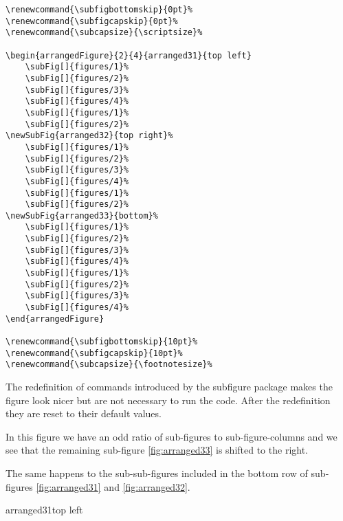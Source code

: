 \documentclass[12pt,a4paper]{article}
\begin{document}
\begin{verbatim}
\renewcommand{\subfigbottomskip}{0pt}%
\renewcommand{\subfigcapskip}{0pt}%
\renewcommand{\subcapsize}{\scriptsize}%

\begin{arrangedFigure}{2}{4}{arranged31}{top left}
    \subFig[]{figures/1}%
    \subFig[]{figures/2}%
    \subFig[]{figures/3}%
    \subFig[]{figures/4}%
    \subFig[]{figures/1}%
    \subFig[]{figures/2}%
\newSubFig{arranged32}{top right}%
    \subFig[]{figures/1}%
    \subFig[]{figures/2}%
    \subFig[]{figures/3}%
    \subFig[]{figures/4}%
    \subFig[]{figures/1}%
    \subFig[]{figures/2}%
\newSubFig{arranged33}{bottom}%
    \subFig[]{figures/1}%
    \subFig[]{figures/2}%
    \subFig[]{figures/3}%
    \subFig[]{figures/4}%
    \subFig[]{figures/1}%
    \subFig[]{figures/2}%
    \subFig[]{figures/3}%
    \subFig[]{figures/4}%
\end{arrangedFigure}

\renewcommand{\subfigbottomskip}{10pt}%
\renewcommand{\subfigcapskip}{10pt}%
\renewcommand{\subcapsize}{\footnotesize}%
\end{verbatim}

The redefinition of commands introduced by the subfigure package makes the figure 
look nicer but are not necessary to run the code. After the redefinition they are reset to 
their default values.

In this figure we have an odd ratio of sub-figures to sub-figure-columns
and we see that the remaining sub-figure \ref{fig:arranged33} is shifted 
to the right.

The same happens to the sub-sub-figures included in the bottom row of 
sub-figures \ref{fig:arranged31} and \ref{fig:arranged32}.


    \renewcommand{\subfigbottomskip}{0pt}%
    \renewcommand{\subfigcapskip}{0pt}%
    \renewcommand{\subcapsize}{\scriptsize}%

\begin{arrangedFigure}{2}{4}{arranged31}{top left}
\end{arrangedFigure}
\end{document}
